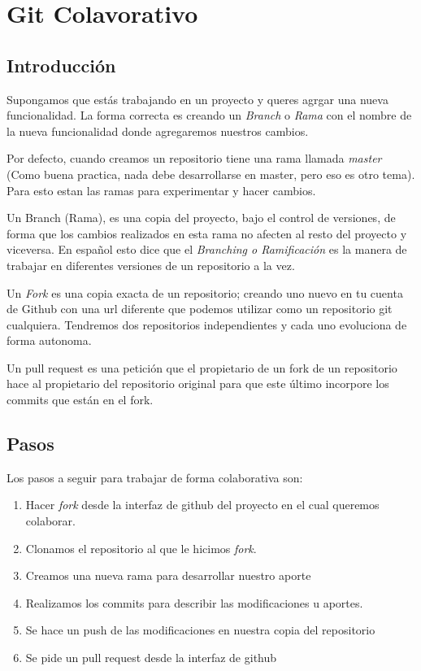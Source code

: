 \documentclass[10pt,journal,compsoc]{IEEEtran}
\begin{document}
\section{Git Colavorativo}
\subsection{Introducción}
Supongamos que estás trabajando en un proyecto y queres agrgar una nueva funcionalidad. La forma correcta es creando un \textit{Branch} o  \textit{Rama} con el nombre de la nueva funcionalidad donde agregaremos nuestros cambios.

Por defecto, cuando creamos un repositorio tiene una rama llamada \textit{master} (Como buena practica, nada debe desarrollarse en master, pero eso es otro tema). Para esto estan las ramas para experimentar y hacer cambios.

Un Branch (Rama), es una copia del proyecto, bajo el control de versiones, de forma que los cambios realizados en esta rama no afecten al resto del proyecto y viceversa. En español esto dice que el \textit{Branching o Ramificación} es la manera de trabajar en diferentes versiones de un repositorio a la vez.

Un \textit{Fork} es una copia exacta de un repositorio; creando uno nuevo en tu cuenta de Github con una url diferente que podemos utilizar como un repositorio git cualquiera. Tendremos dos repositorios independientes y cada uno evoluciona de forma autonoma.

Un pull request es una petición que el propietario de un fork de un repositorio hace al propietario del repositorio original para que este último incorpore los commits que están en el fork.

\subsection{Pasos} 
 Los pasos a seguir para trabajar de forma colaborativa son:
 
 \begin{enumerate}
 \item Hacer \textit{fork} desde la interfaz de github del proyecto en el cual queremos colaborar.
 \item Clonamos el repositorio al que le hicimos \textit{fork}.
 \item Creamos una nueva rama para desarrollar nuestro aporte
 \item Realizamos los commits para describir las modificaciones u aportes.
 \item Se hace un push de las modificaciones en nuestra copia del repositorio
 \item Se pide un pull request desde la interfaz de github
 \end{enumerate}
\end{document}
